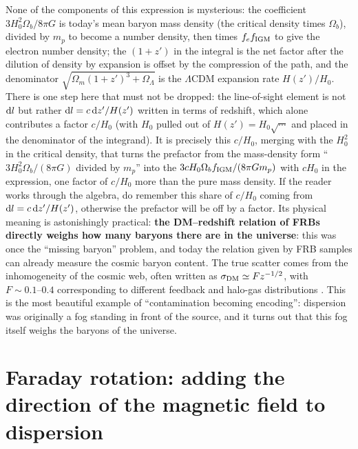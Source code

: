 None of the components of this expression is mysterious: the coefficient \(3H_0^2\Omega_b/8\pi G\) is today's mean baryon mass density (the critical density times \(\Omega_b\)), divided by \(m_p\) to become a number density, then times \(f_e f_{\rm IGM}\) to give the electron number density; the \((1+z')\) in the integral is the net factor after the dilution of density by expansion is offset by the compression of the path, and the denominator \(\sqrt{\Omega_m(1+z')^3+\Omega_\Lambda}\) is the \(\Lambda\)CDM expansion rate \(H(z')/H_0\). There is one step here that must not be dropped: the line-of-sight element is not \({\rm d}l\) but rather \({\rm d}l=c\,{\rm d}z'/H(z')\) written in terms of redshift, which alone contributes a factor \(c/H_0\) (with \(H_0\) pulled out of \(H(z')=H_0\sqrt{\cdots}\) and placed in the denominator of the integrand). It is precisely this \(c/H_0\), merging with the \(H_0^2\) in the critical density, that turns the prefactor from the mass-density form ``\(3H_0^2\Omega_b/(8\pi G)\) divided by \(m_p\)'' into the \(3cH_0\Omega_b f_{\rm IGM}/(8\pi Gm_p)\) with \(cH_0\) in the expression, one factor of \(c/H_0\) more than the pure mass density. If the reader works through the algebra, do remember this share of \(c/H_0\) coming from \({\rm d}l=c\,{\rm d}z'/H(z')\), otherwise the prefactor will be off by a factor. Its physical meaning is astonishingly practical: \textbf{the DM--redshift relation of FRBs directly weighs how many baryons there are in the universe}: this was once the ``missing baryon'' problem, and today the relation given by FRB samples can already measure the cosmic baryon content. The true scatter comes from the inhomogeneity of the cosmic web, often written as \(\sigma_{\rm DM}\simeq F z^{-1/2}\), with \(F\sim0.1\text{--}0.4\) corresponding to different feedback and halo-gas distributions \citep{2020Natur.581..391M,2014ApJ...790..101S}. This is the most beautiful example of ``contamination becoming encoding'': dispersion was originally a fog standing in front of the source, and it turns out that this fog itself weighs the baryons of the universe.

\section{Faraday rotation: adding the direction of the magnetic field to dispersion}
\label{sec:e21-faraday}

